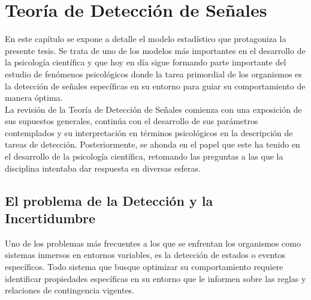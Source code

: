 
\chapter{Teoría de Detección de Señales} %

\label{Cap_SDT} %


\newcommand{\keyword}[1]{\textbf{#1}}
\newcommand{\tabhead}[1]{\textbf{#1}}
\newcommand{\code}[1]{\texttt{#1}}
\newcommand{\file}[1]{\texttt{\bfseries#1}}
\newcommand{\option}[1]{\texttt{\itshape#1}}


En este capítulo se expone a detalle el modelo estadístico que protagoniza la presente tesis. Se trata de uno de los modelos más importantes en el desarrollo de la psicología científica y que hoy en día sigue formando parte importante del estudio de fenómenos psicológicos donde la tarea primordial de los organismos es la detección de señales específicas en su entorno para guiar su comportamiento de manera óptima.\\

La revisión de la Teoría de Detección de Señales comienza con una exposición de sus supuestos generales, continúa con el desarrollo de sus parámetros contemplados y su interpretación en términos psicológicos en la descripción de tareas de detección. Posteriormente, se ahonda en el papel que este ha tenido en el desarrollo de la psicología científica, retomando las preguntas a las que la disciplina intentaba dar respuesta en diversas esferas.\\

\section{El problema de la Detección y la Incertidumbre}

Uno de los problemas más frecuentes a los que se enfrentan los organismos como sistemas inmersos en entornos variables, es la detección de estados o eventos específicos. Todo sistema que busque optimizar su comportamiento requiere identificar propiedades específicas en su entorno que le informen sobre las reglas y relaciones de contingencia vigentes.\\

